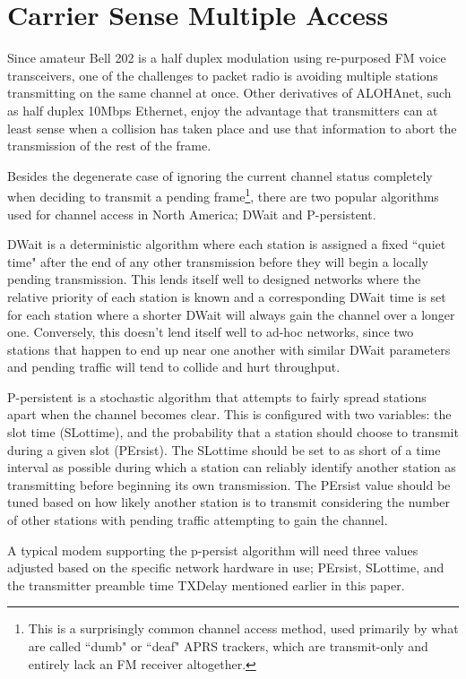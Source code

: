 \documentclass[12pt,letterpaper]{article}
\begin{document}
\section{Carrier Sense Multiple Access}
\label{sec:bell202csma}

Since amateur Bell 202 is a half duplex modulation using re-purposed 
FM voice transceivers, 
one of the challenges to packet radio is avoiding multiple stations
transmitting on the same channel at once. 
Other derivatives of ALOHAnet, 
such as half duplex 10Mbps Ethernet, 
enjoy the advantage that transmitters can
at least sense when a collision has taken place 
and use that information to abort the transmission of the rest of the frame.

Besides the degenerate case of ignoring the current channel status completely when 
deciding to transmit a pending frame\footnote{This is a surprisingly
	common channel access method, used primarily by what are called ``dumb" or
	``deaf" APRS trackers, which are transmit-only and entirely lack an
FM receiver altogether.}, there are two popular algorithms used for
channel access in North America;
DWait and P-persistent.

DWait is a deterministic algorithm where each station is assigned a fixed
``quiet time" after the end of any other transmission 
before they will begin a locally pending transmission. 
This lends itself well to designed networks
where the relative priority of each station is known and a corresponding DWait time
is set for each station where a shorter DWait will 
always gain the channel over a longer one. 
Conversely, this doesn't lend itself well to ad-hoc networks, since
two stations that happen to end up near one another with similar DWait parameters
and pending traffic will tend to collide and hurt throughput.

P-persistent is a stochastic algorithm that attempts to fairly spread
stations apart when the channel becomes clear. 
This is configured with two variables: the slot time (SLottime), and the
probability that a station should choose to transmit during a given slot (PErsist). 
The SLottime
should be set to as short of a time interval as possible during which a station can
reliably identify another station as transmitting 
before beginning its own transmission.
The PErsist value should be tuned based on how likely another station is to transmit 
considering the number of other stations with 
pending traffic attempting to gain the channel.

A typical modem supporting the p-persist algorithm will need three values adjusted
based on the specific network hardware in use; PErsist, SLottime, and the 
transmitter preamble time TXDelay mentioned earlier in this paper.
\end{document}
